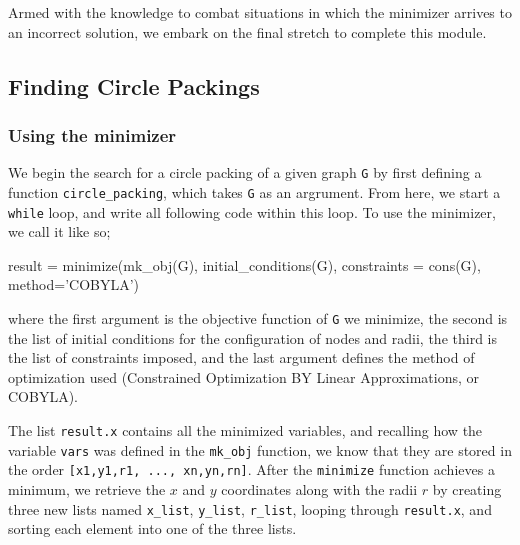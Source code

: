 \begin{flushleft}
Armed with the knowledge to combat situations in which the minimizer arrives to an incorrect solution, we embark on the final stretch to complete this module. 
\end{flushleft}

\subsection{Finding Circle Packings}

\subsubsection{Using the minimizer}

\begin{flushleft}
We begin the search for a circle packing of a given graph \texttt{G} by first defining a function \texttt{circle\_packing}, which takes \texttt{G} as an argrument. From here, we start a \texttt{while} loop, and write all following code within this loop. To use the minimizer, we call it like so;
\end{flushleft}

\begin{code}
    result = minimize(mk_obj(G), initial_conditions(G), 
                        constraints = cons(G), method='COBYLA')
\end{code}

\begin{flushleft}
where the first argument is the objective function of \texttt{G} we minimize, the second is the list of initial conditions for the configuration of nodes and radii, the third is the list of constraints imposed, and the last argument defines the method of optimization used (Constrained Optimization BY Linear Approximations, or COBYLA). 
\end{flushleft}

\begin{flushleft}
The list \texttt{result.x} contains all the minimized variables, and recalling how the variable \texttt{vars} was defined in the \texttt{mk\_obj} function, we know that they are stored in the order \texttt{[x1,y1,r1, ..., xn,yn,rn]}. After the \texttt{minimize} function achieves a minimum, we retrieve the $x$ and $y$ coordinates along with the radii $r$ by creating three new lists named \texttt{x\_list}, \texttt{y\_list}, \texttt{r\_list}, looping through \texttt{result.x}, and sorting each element into one of the three lists. 
\end{flushleft}


